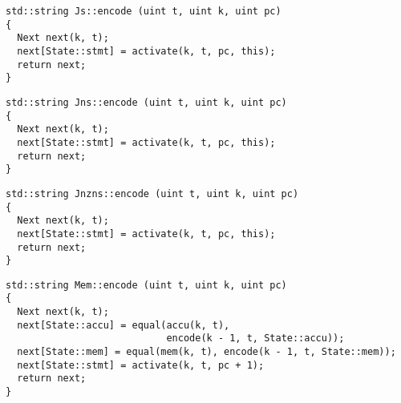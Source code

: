 
\begin{lstlisting}[style=c++, style=encode]
std::string Js::encode (uint t, uint k, uint pc)
{
  Next next(k, t);
  next[State::stmt] = activate(k, t, pc, this);
  return next;
}
\end{lstlisting}


\begin{lstlisting}[style=c++, style=encode]
std::string Jns::encode (uint t, uint k, uint pc)
{
  Next next(k, t);
  next[State::stmt] = activate(k, t, pc, this);
  return next;
}
\end{lstlisting}


\begin{lstlisting}[style=c++, style=encode]
std::string Jnzns::encode (uint t, uint k, uint pc)
{
  Next next(k, t);
  next[State::stmt] = activate(k, t, pc, this);
  return next;
}
\end{lstlisting}


\newpage

\begin{lstlisting}[style=c++, style=encode]
std::string Mem::encode (uint t, uint k, uint pc)
{
  Next next(k, t);
  next[State::accu] = equal(accu(k, t),
                            encode(k - 1, t, State::accu));
  next[State::mem] = equal(mem(k, t), encode(k - 1, t, State::mem));
  next[State::stmt] = activate(k, t, pc + 1);
  return next;
}
\end{lstlisting}


